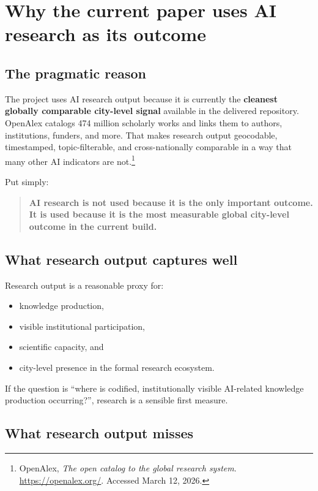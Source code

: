 \documentclass[11pt]{article}
\begin{document}
\section{Why the current paper uses AI research as its outcome}

\subsection{The pragmatic reason}

The project uses AI research output because it is currently the \textbf{cleanest globally comparable city-level signal} available in the delivered repository. OpenAlex catalogs 474 million scholarly works and links them to authors, institutions, funders, and more. That makes research output geocodable, timestamped, topic-filterable, and cross-nationally comparable in a way that many other AI indicators are not.\footnote{OpenAlex, \emph{The open catalog to the global research system}. \url{https://openalex.org/}. Accessed March 12, 2026.}

Put simply:

\begin{quote}
\textbf{AI research is not used because it is the only important outcome. It is used because it is the most measurable global city-level outcome in the current build.}
\end{quote}

\subsection{What research output captures well}

Research output is a reasonable proxy for:

\begin{itemize}[leftmargin=*]
  \item knowledge production,
  \item visible institutional participation,
  \item scientific capacity, and
  \item city-level presence in the formal research ecosystem.
\end{itemize}

If the question is ``where is codified, institutionally visible AI-related knowledge production occurring?'', research is a sensible first measure.

\subsection{What research output misses}
\end{document}
